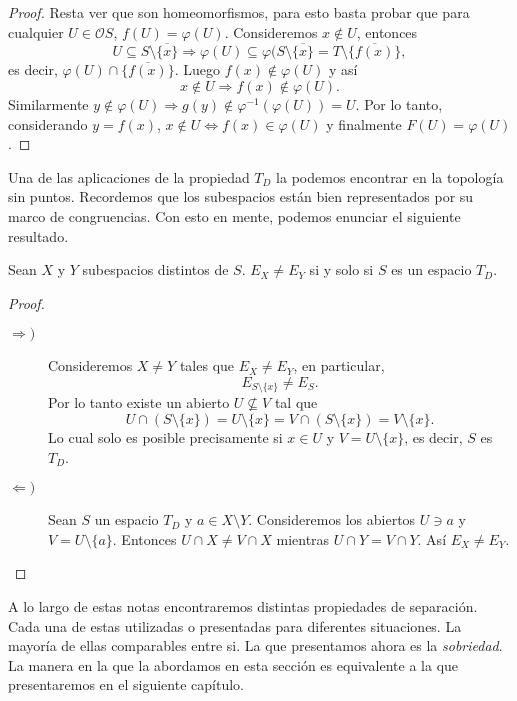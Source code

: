 \documentclass{comunicaciones}
\begin{document}
\begin{proof}
    \noindent
    Resta ver que son homeomorfismos, para esto basta probar que para cualquier $U\in \mathcal{O}S$, $f(U)=\varphi(U)$. Consideremos $x\notin U$, entonces
    \[
    U\subseteq S\setminus \overline{\{x\}}\Rightarrow \varphi(U)\subseteq \varphi(S\setminus\overline{\{x\}}=T\setminus \overline{\{f(x)\}},
    \]
    es decir, $\varphi(U)\cap \overline{\{f(x)\}}$. Luego $f(x)\notin \varphi(U)$ y así 
    \[
    x\notin U \Rightarrow f(x)\notin \varphi (U).
    \]
    Similarmente $y\notin\varphi(U)\Rightarrow g(y)\notin \varphi^{-1}(\varphi(U))=U$. Por lo tanto, considerando $y=f(x)$, $x\notin U\Leftrightarrow f(x)\in \varphi(U)$ y finalmente $F(U)=\varphi(U)$.
    \end{proof}

Una de las aplicaciones de la propiedad $T_D$ la podemos encontrar en la topología sin puntos. Recordemos que los subespacios están bien representados por su marco de congruencias. Con esto en mente, podemos enunciar el siguiente resultado.

\begin{thm}
    Sean $X$ y $Y$ subespacios distintos de $S$. $E_X\neq E_Y$ si y solo si $S$ es un espacio $T_D$.
\end{thm}

\begin{proof}
    \begin{description}
        \item[$\Rightarrow )$] Consideremos $X\neq Y$ tales que $E_X\neq E_Y$, en particular, 
        \[
        E_{S\setminus \{x\}}\neq E_S.
        \]
        Por lo tanto existe un abierto $U\nsubseteq V$ tal que 
        \[
        U\cap (S\setminus \{x\})=U\setminus\{x\}=V\cap (S\setminus \{x\})=V\setminus\{x\}.
        \]
        Lo cual solo es posible precisamente si $x\in U$ y $V=U\setminus \{x\}$, es decir, $S$ es $T_D$.
        \item[$\Leftarrow )$] Sean $S$ un espacio $T_D$ y $a\in X\setminus Y$. Consideremos los abiertos $U\ni a$ y $V=U\setminus\{a\}$. Entonces $U\cap X\neq V\cap X$ mientras $U\cap Y=V\cap Y$. Así $E_X\neq E_Y$. 
    \end{description}
\end{proof}

A lo largo de estas notas encontraremos distintas propiedades de separación. Cada una de estas utilizadas o presentadas para diferentes situaciones. La mayoría de ellas comparables entre si. La que presentamos ahora es la \emph{sobriedad}. La manera en la que la abordamos en esta sección es equivalente a la que presentaremos en el siguiente capítulo.\\
\end{document}
